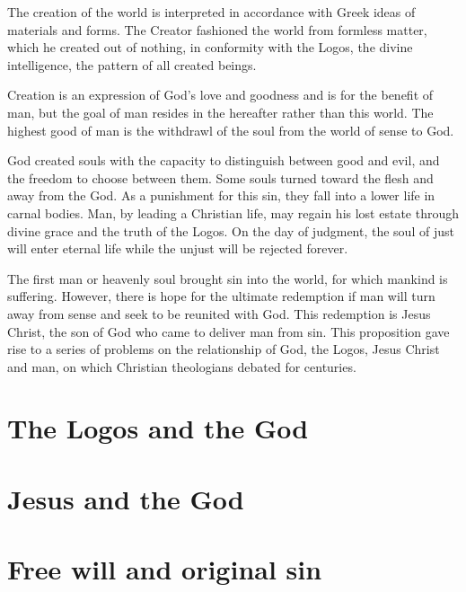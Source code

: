 \documentclass[11pt]{article}
\begin{document}
\par

The creation of the world is interpreted in accordance with Greek ideas of materials and forms. 
The Creator fashioned the world from formless matter, which he created out of nothing, in conformity with the Logos, the divine intelligence, the pattern of all created beings. 

\par

Creation is an expression of God's love and goodness and is for the benefit of man, but the goal of man resides in the hereafter rather than this world. 
The highest good of man is the withdrawl of the soul from the world of sense to God. 

\par

God created souls with the capacity to distinguish between good and evil, and the freedom to choose between them. 
Some souls turned toward the flesh and away from the God. 
As a punishment for this sin, they fall into a lower life in carnal bodies. 
Man, by leading a Christian life, may regain his lost estate through divine grace and the truth of the Logos. 
On the day of judgment, the soul of just will enter eternal life while the unjust will be rejected forever. 

\par

The first man or heavenly soul brought sin into the world, for which mankind is suffering. 
However, there is hope for the ultimate redemption if man will turn away from sense and seek to be reunited with God. 
This redemption is Jesus Christ, the son of God who came to deliver man from sin. 
This proposition gave rise to a series of problems on the relationship of God, the Logos, Jesus Christ and man, on which Christian theologians debated for centuries. 

\section{The Logos and the God}
\section{Jesus and the God}
\section{Free will and original sin}
\end{document}
